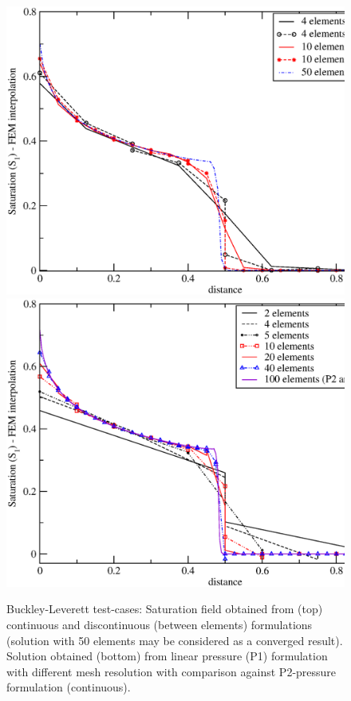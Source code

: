 \begin{figure}[h]
\vbox{
\hbox{\hspace{.3cm}\includegraphics[width=.9\textwidth]{bl-dg-4-10-vers-cty}}
\vspace{-0.cm}
\hbox{\hspace{.3cm}\includegraphics[width=.9\textwidth]{bl-dg-p1-2-4-5-10-20-40}}}
\caption{Buckley-Leverett test-cases: Saturation field obtained from (top) continuous and discontinuous (between elements) formulations (solution with 50 elements may be considered as a converged result). Solution obtained (bottom) from linear pressure (P1) formulation with different mesh resolution with comparison against P2-pressure formulation (continuous). \label{bl-dg-4-10-vers-cty}}
\end{figure}


